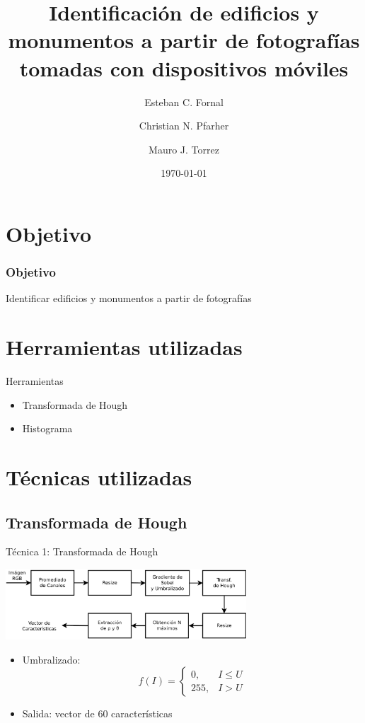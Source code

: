 \documentclass[spanish]{beamer}
\title{Identificación de edificios y monumentos a partir de fotografías tomadas
con dispositivos móviles}
\author{Esteban C. Fornal \and Christian N. Pfarher \and Mauro J. Torrez}
\date{\today}
\begin{document}
%
\frame{\titlepage}
%
\section{Objetivo}
\begin{frame}
  \frametitle{Objetivo}
  Identificar edificios y monumentos a partir de fotografías
\end{frame}
%
\section{Herramientas utilizadas}
\begin{frame}{Herramientas}
  \begin{itemize}
  \item<1-> Transformada de Hough
  \item<2-> Histograma
  \end{itemize}
\end{frame}
%
\section{Técnicas utilizadas}
%
\subsection{Transformada de Hough}
\begin{frame}{Técnica 1: Transformada de Hough}
\begin{center}
  \includegraphics[width=9cm]{../diagramas/procesohough}
\end{center}
\begin{itemize}
\item Umbralizado:
  \begin{equation*}
    \label{umbral}
    f(I)=
    \begin{cases}
      0, & I\leq U\\
      255, & I > U
    \end{cases}
  \end{equation*}
\item Salida: vector de 60 características
\end{itemize}
\end{frame}
%
\end{document}
